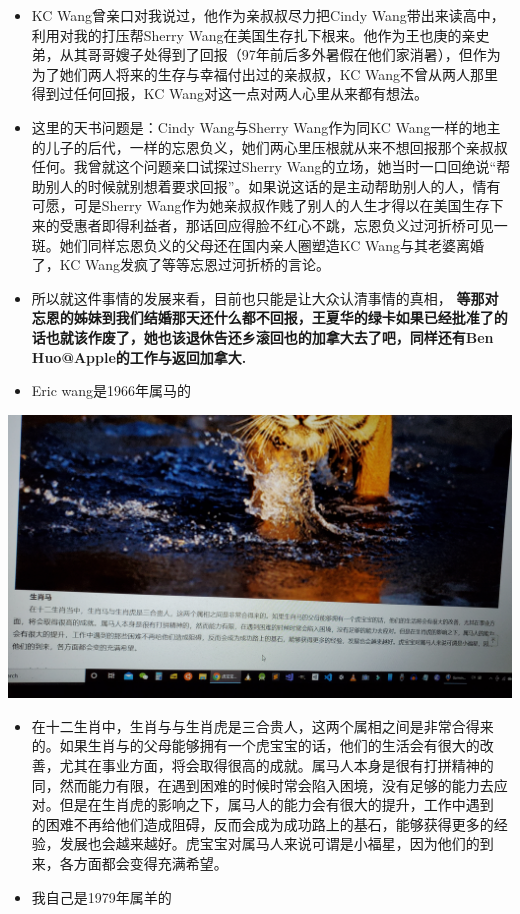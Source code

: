 \documentclass[9pt, b5paper]{article}
\begin{document}
\begin{itemize}
\begin{itemize}
\begin{itemize}
\item KC Wang曾亲口对我说过，他作为亲叔叔尽力把Cindy Wang带出来读高中，利用对我的打压帮Sherry Wang在美国生存扎下根来。他作为王也庚的亲史弟，从其哥哥嫂子处得到了回报（97年前后多外暑假在他们家消暑），但作为为了她们两人将来的生存与幸福付出过的亲叔叔，KC Wang不曾从两人那里得到过任何回报，KC Wang对这一点对两人心里从来都有想法。
\item 这里的天书问题是：Cindy Wang与Sherry Wang作为同KC Wang一样的地主的儿子的后代，一样的忘恩负义，她们两心里压根就从来不想回报那个亲叔叔任何。我曾就这个问题亲口试探过Sherry Wang的立场，她当时一口回绝说“帮助别人的时候就别想着要求回报”。如果说这话的是主动帮助别人的人，情有可愿，可是Sherry Wang作为她亲叔叔作贱了别人的人生才得以在美国生存下来的受惠者即得利益者，那话回应得脸不红心不跳，忘恩负义过河折桥可见一斑。她们同样忘恩负义的父母还在国内亲人圈塑造KC Wang与其老婆离婚了，KC Wang发疯了等等忘恩过河折桥的言论。
\item 所以就这件事情的发展来看，目前也只能是让大众认清事情的真相， \textbf{等那对忘恩的姊妹到我们结婚那天还什么都不回报，王夏华的绿卡如果已经批准了的话也就该作废了，她也该退休告还乡滚回也的加拿大去了吧，同样还有Ben Huo@Apple的工作与返回加拿大.}
\item Eric wang是1966年属马的
\end{itemize}

\begin{center}
\includegraphics[width=.9\linewidth]{./pic/20210218_200445.jpg}
\end{center}
\begin{itemize}
\item 在十二生肖中，生肖与与生肖虎是三合贵人，这两个属相之间是非常合得来的。如果生肖与的父母能够拥有一个虎宝宝的话，他们的生活会有很大的改善，尤其在事业方面，将会取得很高的成就。属马人本身是很有打拼精神的同，然而能力有限，在遇到困难的时候时常会陷入困境，没有足够的能力去应对。但是在生肖虎的影响之下，属马人的能力会有很大的提升，工作中遇到 的困难不再给他们造成阻碍，反而会成为成功路上的基石，能够获得更多的经验，发展也会越来越好。虎宝宝对属马人来说可谓是小福星，因为他们的到来，各方面都会变得充满希望。
\item 我自己是1979年属羊的
\end{itemize}


\end{itemize}
\end{itemize}
\end{document}
